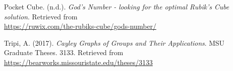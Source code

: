 \documentclass[a4paper]{article}
\begin{document}
\par Pocket Cube. (n.d.). \emph{God's Number - looking for the optimal Rubik's Cube solution}. Retrieved from\\ \url{https://ruwix.com/the-rubiks-cube/gods-number/}

\par Tripi, A. (2017). \emph{Cayley Graphs of Groups and Their Applications}. MSU Graduate Theses. 3133. Retrieved from\\ \url{https://bearworks.missouristate.edu/theses/3133}
\end{document}
